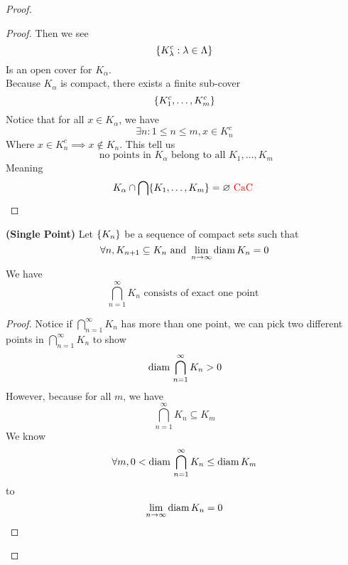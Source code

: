 \documentclass{report}
\begin{document}
\begin{proof}
\begin{proof}
Then we see
\begin{equation}
\{ K_{\lambda}^c: \lambda  \in\Lambda  \}
\end{equation}
Is an open cover for $K_\alpha $.\\

Because $K_\alpha $ is compact, there exists a finite sub-cover
\begin{equation}
\{ K^c_1,\dots, K^c_m \}
\end{equation}
Notice that for all $x\in K_\alpha $, we have
\begin{equation}
\exists n:1\leq n\leq m, x\in K^c_n 
\end{equation}
Where $x\in K_n^c\implies x\not\in K_n$. This tell us 
\begin{equation}
\text{ no points in $K_\alpha $ belong to all }K_1,\dots ,K_m
\end{equation}
Meaning
\begin{equation}
  K_{\alpha }\cap \bigcap \{ K_1,\dots, K_m \}=\varnothing\text{ \textcolor{red}{CaC} }
\end{equation}
\end{proof}
\begin{corollary}
\label{1.13.6}
\textbf{(Single Point)} Let $\{ K_n \}$ be a sequence of compact sets such that 
 \begin{equation}
   \forall n,K_{n+1}\subseteq K_n\text{ and }\lim_{n\to\infty}\text{diam}\, K_n=0
\end{equation}
We have
\begin{equation}
\bigcap_{n=1}^\infty K_n\text{ consists of exact one point }
\end{equation}
\end{corollary}
\begin{proof}
Notice if $\bigcap_{n=1}^\infty K_n$ has more than one point, we can pick two different points in $\bigcap_{n=1}^\infty K_n$ to show
\begin{equation}
  \text{diam}\, \bigcap_{n=1}^\infty K_n>0
\end{equation}
However, because for all $m$, we have
 \begin{equation}
\bigcap_{n=1}^\infty K_n\subseteq K_m
\end{equation}
We know
\begin{equation}
\forall m, 0<\text{diam}\, \bigcap_{n=1}^\infty K_n\leq \text{diam}\, K_m
\end{equation}
\CaC to
\begin{equation}
\lim_{n\to\infty}\text{diam}\, K_n=0
\end{equation}
\end{proof}

\end{proof}
\end{document}

